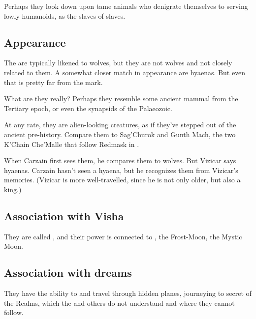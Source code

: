 Perhaps they look down upon tame animals who denigrate themselves to serving lowly humanoids, as the slaves of slaves.







\subsection{Appearance}
The \moonwolves{} are typically likened to wolves, but they are not wolves and not closely related to them. A somewhat closer match in appearance are hyaenas. But even that is pretty far from the mark.

What are they really? Perhaps they resemble some ancient mammal from the Tertiary epoch, or even the synapsids of the Palaeozoic.

At any rate, they are alien-looking creatures, as if they've stepped out of the ancient pre-history. Compare them to Sag'Churok and Gunth Mach, the two K'Chain Che'Malle that follow Redmask in \MalazanReapersGale.

When Carzain first sees them, he compares them to wolves. But Vizicar says hyaenas. Carzain hasn't seen a hyaena, but he recognizes them from Vizicar's memories. (Vizicar is more well-travelled, since he is not only older, but also a king.)








\subsection{Association with Visha}
\label{Moon-Wolves and the Moon}
\label{Moon-Wolves and Visha}
They are called , and their power is connected to , the Frost-Moon, the Mystic Moon. 







\subsection{Association with dreams}
They have the ability to  and travel through hidden planes, journeying to secret  of the Realms, which the \dragons{} and others do not understand and where they cannot follow. 

